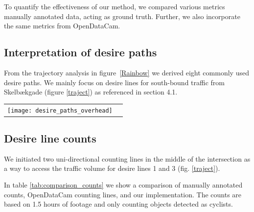 To quantify the effectiveness of our method, we compared various metrics manually annotated data, acting as ground truth. 
Further, we also incorporate the same metrics from OpenDataCam.

\subsection{Interpretation of desire paths}
From the trajectory analysis in figure~\ref{Rainbow} we derived eight commonly used desire paths.
We mainly focus on desire lines for south-bound traffic from Skelbækgade (figure \ref{traject}) as referenced in section 4.1.
\ \\

\raggedbottom
\begin{tabular}{@{}cc}
\texttt{[image: desire\_paths\_overhead]} 
\end{tabular}
\label{traject}

\subsection{Desire line counts}
We initiated two uni-directional counting lines in the middle of the intersection as a way to access the traffic volume for desire lines 1 and 3 (fig. \ref{traject}).

In table \ref{tab:comparison_counts} we show a comparison of manually annotated counts, OpenDataCam counting lines, 
and our implementation. The counts are based on 1.5 hours of footage and only counting objects detected as cyclists.

\begin{table}[h]
\caption{Comparison of counts}
\label{tab:comparison_counts}
\end{table}

